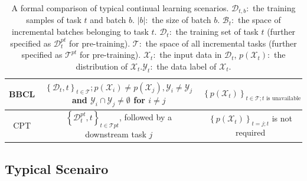 \begin{table}[H]
{\begin{tabular}{c|c|c}
            \hline BBCL       & \(\left\{\mathcal{D}_{t}, t\right\}_{t \in \mathcal{T}} ; p\left(\mathcal{X}_{i}\right) \neq p\left(\mathcal{X}_{j}\right), \mathcal{Y}_{i} \neq \mathcal{Y}_{j}\) and \(\mathcal{Y}_{i} \cap \mathcal{Y}_{j} \neq \emptyset\) for \(i \neq j\) & \(\left\{p\left(\mathcal{X}_{t}\right)\right\}_{t \in \mathcal{T} ; t \text { is unavailable }}\) \\
            \hline CPT        & \(\left\{\mathcal{D}_{t}^{p t}, t\right\}_{t \in \mathcal{T} p t}\), followed by a downstream task \(j\)                                                                                                                                        & \(\left\{p\left(\mathcal{X}_{t}\right)\right\}_{t=j ; t}\) is not required                        \\
            \hline\end{tabular}}
    \caption{A formal comparison of typical continual learning scenarios. \(\mathcal{D}_{t, b}:\) the training samples of task \(t\) and batch \(b\). \(|b|:\) the size of batch \(b\). \(\mathcal{B}_{t}:\) the space of incremental batches belonging to task \(t\). \(\mathcal{D}_{t}:\) the training set of task \(t\) (further specified as \(\mathcal{D}_{t}^{p t}\) for pre-training). \(\mathcal{T}:\) the space of all incremental tasks (further specified as \(\mathcal{T}^{p t}\) for pre-training). \(\mathcal{X}_{t}:\) the input data in \(\mathcal{D}_{t}\), \(p\left(\mathcal{X}_{t}\right):\) the distribution of \(\mathcal{X}_{t} . \mathcal{Y}_{t}:\) the data label of \(\mathcal{X}_{t}\).}
    \label{table:4.1}
\end{table}

\subsection{Typical Scenairo}

